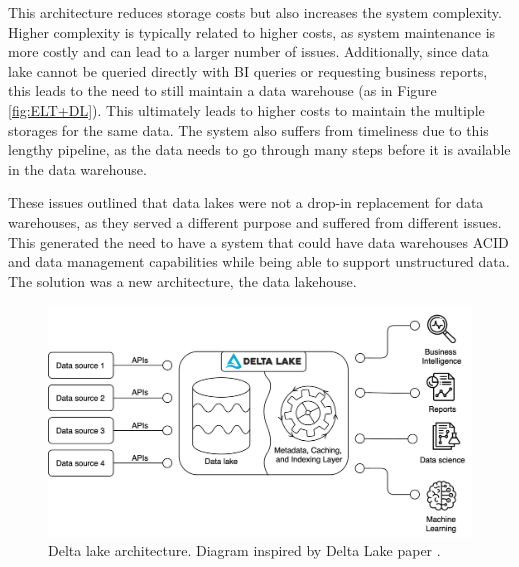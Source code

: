 This architecture reduces storage costs but also increases the system complexity. Higher complexity is typically related to higher costs, as system maintenance is more costly and can lead to a larger number of issues. Additionally, since data lake cannot be queried directly with \gls{BI} queries or requesting business reports, this leads to the need to still maintain a data warehouse (as in Figure \ref{fig:ELT+DL}). This ultimately leads to higher costs to maintain the multiple storages for the same data. The system also suffers from timeliness due to this lengthy pipeline, as the data needs to go through many steps before it is available in the data warehouse. 

These issues outlined that data lakes were not a drop-in replacement for data warehouses, as they served a different purpose and suffered from different issues. This generated the need to have a system that could have data warehouses \gls{ACID} and data management capabilities while being able to support unstructured data. The solution was a new architecture, the data lakehouse. 

\begin{figure}[!ht]
    \begin{center}
      \includegraphics[width=\textwidth]{figures/2-background/DeltaLake_evolution-DeltaLake.png}
    \end{center}
    \caption[Delta lake architecture]{Delta lake architecture. Diagram inspired by Delta Lake paper \cite{armbrustDeltaLakeHighperformance2020}.}
    \label{fig:DeltaLake}
\end{figure}

